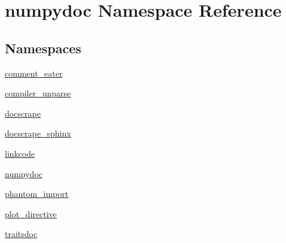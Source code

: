 \hypertarget{namespacenumpydoc}{}\section{numpydoc Namespace Reference}
\label{namespacenumpydoc}
\subsection*{Namespaces}
\begin{DoxyCompactItemize}
\item 
 \hyperlink{namespacenumpydoc_1_1comment__eater}{comment\+\_\+eater}
\item 
 \hyperlink{namespacenumpydoc_1_1compiler__unparse}{compiler\+\_\+unparse}
\item 
 \hyperlink{namespacenumpydoc_1_1docscrape}{docscrape}
\item 
 \hyperlink{namespacenumpydoc_1_1docscrape__sphinx}{docscrape\+\_\+sphinx}
\item 
 \hyperlink{namespacenumpydoc_1_1linkcode}{linkcode}
\item 
 \hyperlink{namespacenumpydoc_1_1numpydoc}{numpydoc}
\item 
 \hyperlink{namespacenumpydoc_1_1phantom__import}{phantom\+\_\+import}
\item 
 \hyperlink{namespacenumpydoc_1_1plot__directive}{plot\+\_\+directive}
\item 
 \hyperlink{namespacenumpydoc_1_1traitsdoc}{traitsdoc}
\end{DoxyCompactItemize}

